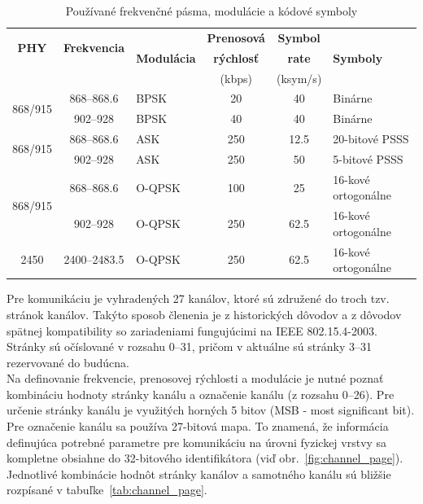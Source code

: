 \begin{table}[htbp]
\begin{center}
\begin{tabular}{|c|c|l|c|c|l|}
  \hline
  \multirow{2}{*}{\textbf{PHY}} & \multirow{2}{*}{\textbf{Frekvencia}} & \multirow{3}{*}{\textbf{Modulácia}} & \textbf{Prenosová} & \textbf{Symbol} & \multirow{3}{*}{\textbf{Symboly}} \\ 
  \multirow{2}{*}{(MHz)} & \multirow{2}{*}{(MHz)} & & \textbf{rýchlosť} & \textbf{rate} & \\ 
  & & & (kbps) & (ksym/s) & \\ [0.5ex]
  \hline\hline
  \multirow{2}{*}{868/915} & 868--868.6 & BPSK & 20 & 40 & Binárne\\
  & 902--928 & BPSK & 40 & 40 & Binárne\\ [0.5ex]
  \hline
  \multirow{2}{*}{868/915} & 868--868.6 & ASK & 250 & 12.5 & 20-bitové PSSS\\
  & 902--928 & ASK & 250 & 50 & 5-bitové PSSS\\ [0.5ex]
  \hline
  \multirow{2}{*}{868/915} & 868--868.6 & O-QPSK & 100 & 25 & 16-kové ortogonálne\\
  & 902--928 & O-QPSK & 250 & 62.5 & 16-kové ortogonálne\\ [0.5ex]
  \hline
  2450 & 2400--2483.5 & O-QPSK & 250 & 62.5 & 16-kové ortogonálne\\ [0.5ex]
  \hline
\end{tabular}
\caption{Používané frekvenčné pásma, modulácie a kódové symboly}
\label{tab:frequencies}
\end{center}
\end{table}

\indent\indent Pre komunikáciu je vyhradených 27 kanálov, ktoré sú združené do troch tzv. stránok kanálov. Takýto sposob členenia je z historických dôvodov a z dôvodov spätnej kompatibility so zariadeniami fungujúcimi na IEEE 802.15.4-2003. Stránky sú očíslované v rozsahu 0--31, pričom v aktuálne sú stránky 3--31 rezervované do budúcna.\\ 
\indent Na definovanie frekvencie, prenosovej rýchlosti a modulácie je nutné poznať kombináciu hodnoty stránky kanálu a označenie kanálu (z rozsahu 0--26). Pre určenie stránky kanálu je využitých horných 5 bitov (MSB - most significant bit). Pre označenie kanálu sa používa 27-bitová mapa. To znamená, že informácia definujúca potrebné parametre pre komunikáciu na úrovni fyzickej vrstvy sa kompletne obsiahne do 32-bitového identifikátora (viď obr.~\ref{fig:channel_page}). Jednotlivé kombinácie hodnôt stránky kanálov a samotného kanálu sú bližšie rozpísané v tabuľke~\ref{tab:channel_page}.\\

